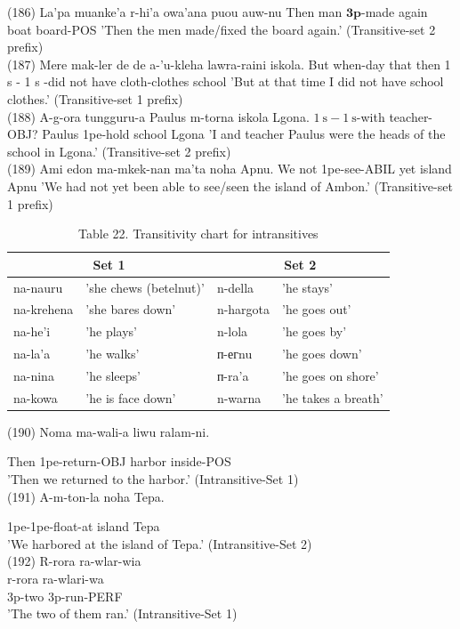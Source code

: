 \documentclass[10pt]{article}
\begin{document}
(186) La'pa muanke'a r-hi'a owa'ana puou auw-nu Then man \(\boldsymbol{3 p}\)-made again boat board-POS 'Then the men made/fixed the board again.' (Transitive-set 2 prefix)\\
(187) Mere mak-ler de de a-'u-kleha lawra-raini iskola. But when-day that then 1 s - 1 s -did not have cloth-clothes school 'But at that time I did not have school clothes.' (Transitive-set 1 prefix)\\
(188) A-g-ora tungguru-a Paulus m-torna iskola Lgona. \(1 \mathrm{~s}-1 \mathrm{~s}\)-with teacher-OBJ? Paulus 1pe-hold school Lgona 'I and teacher Paulus were the heads of the school in Lgona.' (Transitive-set 2 prefix)\\
(189) Ami edon ma-mkek-nan ma'ta noha Apnu. We not 1pe-see-ABIL yet island Apnu 'We had not yet been able to see/seen the island of Ambon.' (Transitive-set 1 prefix)

\begin{table}[h]
\begin{center}
\captionsetup{labelformat=empty}
\caption{Table 22. Transitivity chart for intransitives}
\begin{tabular}{|l|l|l|l|}
\hline
\multicolumn{2}{|c|}{Set 1} & \multicolumn{2}{|c|}{Set 2} \\
\hline
na-nauru & 'she chews (betelnut)' & n-della & 'he stays' \\
\hline
na-krehena & 'she bares down' & n-hargota & 'he goes out' \\
\hline
na-he'i & 'he plays' & n-lola & 'he goes by' \\
\hline
na-la'a & 'he walks' & п-егnu & 'he goes down' \\
\hline
na-nina & 'he sleeps' & п-ra'a & 'he goes on shore' \\
\hline
na-kowa & 'he is face down' & n-warna & 'he takes a breath' \\
\hline
\end{tabular}
\end{center}
\end{table}

(190) Noma ma-wali-a liwu ralam-ni.

Then 1pe-return-OBJ harbor inside-POS\\
'Then we returned to the harbor.' (Intransitive-Set 1)\\
(191) A-m-ton-la noha Tepa.

1pe-1pe-float-at island Tepa\\
'We harbored at the island of Tepa.' (Intransitive-Set 2)\\
(192) R-rora ra-wlar-wia\\
r-rora ra-wlari-wa\\
3p-two 3p-run-PERF\\
'The two of them ran.' (Intransitive-Set 1)
\end{document}
